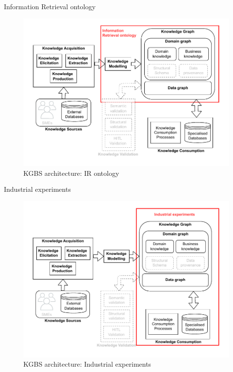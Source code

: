 \begin{frame}{Information Retrieval ontology}

    \begin{figure} [H]
        \begin{center}
            \includegraphics[scale=0.5]{images/KGBS-knowledge-modelling-kg-IR-onto.pdf} 
            \caption{KGBS architecture: IR ontology} 
        \end{center}
    \end{figure}

\end{frame}

\begin{frame}{Industrial experiments}

    \begin{figure} [H]
        \begin{center}
            \includegraphics[scale=0.5]{images/KGBS-knowledge-consumption-industrial-exp.pdf} 
            \caption{KGBS architecture: Industrial experiments} 
        \end{center}
    \end{figure}

\end{frame}

